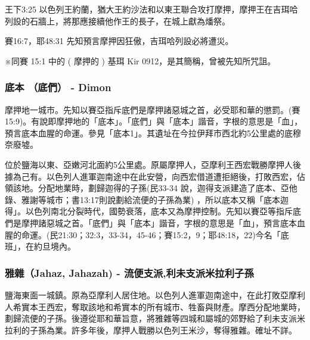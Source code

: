 王下3:25 以色列王約蘭，猶大王約沙法和以東王聯合攻打摩押，摩押王在吉珥哈列設的石牆上，將那應接續他作王的長子，在城上獻為燔祭。

賽16:7，耶48:31 先知預言摩押因狂傲，吉珥哈列設必將遭災。

※同賽 15:1 中的 ( 摩押的 ) 基珥 Kir 0912，是其簡稱，曾被先知所咒詛。

\subsubsection{底本 （底們） - Dimon}
摩押地一城市。先知以賽亞指斥底們是摩押諸惡城之首，必受耶和華的懲罰。(賽15:9)。有說即摩押地的「底本」。「底們」與「底本」諧音，字根的意思是「血」，預言底本血腥的命運。參見「底本1」。其遺址在今拉伊拜市西北約5公里處的底穆奈廢墟。

位於鹽海以東、亞嫩河北面約5公里處。原屬摩押人，亞摩利王西宏戰勝摩押人後據為己有。以色列人進軍迦南途中在此安營，向西宏借道遭拒絕後，打敗西宏，佔領該地。分配地業時，劃歸迦得的子孫(民33-34 說，迦得支派建造了底本、亞他錄、雅謝等城市；書13:17則說劃給流便的子孫為業) ，所以底本又稱「底本迦得」。以色列南北分裂時代，國勢衰落，底本又為摩押控制。先知以賽亞等指斥底們是摩押諸惡城之首。「底們」與「底本」諧音，字根的意思是「血」，預言底本血腥的命運。(民21:30；32:3，33-34，45-46；賽15:2，9；耶48:18，22)今名「底班」，在約旦境內。

\subsubsection{雅雜（Jahaz, Jahazah) - 流便支派,利未支派米拉利子孫}
鹽海東面一城鎮。原為亞摩利人居住地。以色列人進軍迦南途中，在此打敗亞摩利人希實本王西宏，奪取該地和希實本的所有城市、牲畜與財產。摩西分配地業時，劃歸流便的子孫。後遵從耶和華旨意，將雅雜等四城和屬城的郊野給了利未支派米拉利的子孫為業。許多年後，摩押人戰勝以色列王米沙，奪得雅雜。確址不詳。

